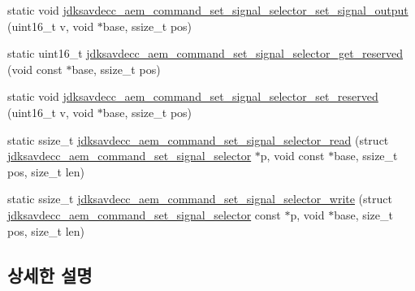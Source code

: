 \begin{DoxyCompactItemize}
\item 
static void \hyperlink{group__command__set__signal__selector_ga01401925e00059c2e887c86ee75a0937}{jdksavdecc\+\_\+aem\+\_\+command\+\_\+set\+\_\+signal\+\_\+selector\+\_\+set\+\_\+signal\+\_\+output} (uint16\+\_\+t v, void $\ast$base, ssize\+\_\+t pos)
\item 
static uint16\+\_\+t \hyperlink{group__command__set__signal__selector_ga929c9673fe046730d2f76fc821f8b18d}{jdksavdecc\+\_\+aem\+\_\+command\+\_\+set\+\_\+signal\+\_\+selector\+\_\+get\+\_\+reserved} (void const $\ast$base, ssize\+\_\+t pos)
\item 
static void \hyperlink{group__command__set__signal__selector_gadff24d1dd91f8ebcaace3f2d863674e3}{jdksavdecc\+\_\+aem\+\_\+command\+\_\+set\+\_\+signal\+\_\+selector\+\_\+set\+\_\+reserved} (uint16\+\_\+t v, void $\ast$base, ssize\+\_\+t pos)
\item 
static ssize\+\_\+t \hyperlink{group__command__set__signal__selector_gadd0cc63e220e3dc24befaf00eca4a179}{jdksavdecc\+\_\+aem\+\_\+command\+\_\+set\+\_\+signal\+\_\+selector\+\_\+read} (struct \hyperlink{structjdksavdecc__aem__command__set__signal__selector}{jdksavdecc\+\_\+aem\+\_\+command\+\_\+set\+\_\+signal\+\_\+selector} $\ast$p, void const $\ast$base, ssize\+\_\+t pos, size\+\_\+t len)
\item 
static ssize\+\_\+t \hyperlink{group__command__set__signal__selector_gafb001fca2c7cdb6d4e698c6678f8fdfc}{jdksavdecc\+\_\+aem\+\_\+command\+\_\+set\+\_\+signal\+\_\+selector\+\_\+write} (struct \hyperlink{structjdksavdecc__aem__command__set__signal__selector}{jdksavdecc\+\_\+aem\+\_\+command\+\_\+set\+\_\+signal\+\_\+selector} const $\ast$p, void $\ast$base, size\+\_\+t pos, size\+\_\+t len)
\end{DoxyCompactItemize}


\subsection{상세한 설명}


